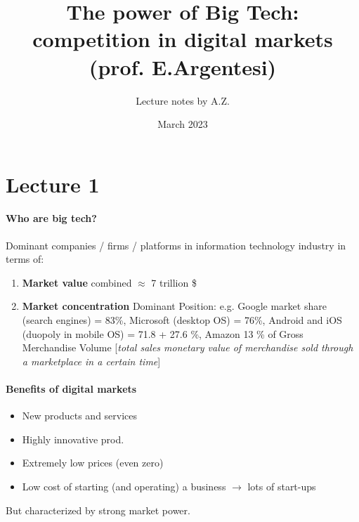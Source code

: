 \documentclass[10pt]{article}
\title{The power of Big Tech:\\competition in digital markets\\(prof. E.Argentesi)}
\author{Lecture notes by A.Z.}
\date{March 2023}
\begin{document}
\maketitle

\section{Lecture 1}
\paragraph{Who are big tech?} Dominant companies / firms / platforms in information technology industry in terms of:
\begin{enumerate}
    \item \textbf{Market value} combined $\approx$ 7 trillion \$
    \item \textbf{Market concentration} Dominant Position: e.g. Google market share (search engines) = 83\%, Microsoft (desktop OS) = 76\%, Android and iOS (duopoly in mobile OS) = 71.8 + 27.6 \%, Amazon 13 \% of Gross Merchandise Volume [\textit{total sales monetary value of merchandise sold through a marketplace in a certain time}]
\end{enumerate}

\paragraph{Benefits of digital markets}
\begin{itemize}
    \item New products and services
    \item Highly innovative prod.
    \item Extremely low prices (even zero)
    \item Low cost of starting (and operating) a business $\rightarrow$ lots of start-ups
\end{itemize}
But characterized by strong market power.
\end{document}
